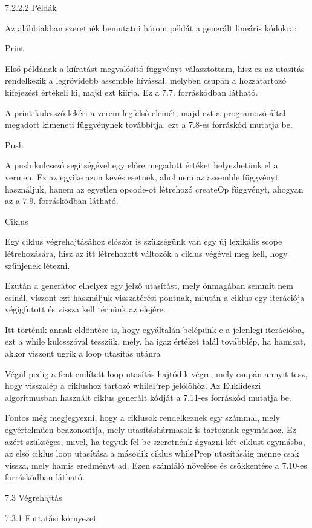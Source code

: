 7.2.2.2 Példák

Az alábbiakban szeretnék bemutatni három példát a generált lineáris kódokra:

Print

Első példának a kiíratást megvalósító függvényt választottam, hisz ez az utasítás rendelkezik a legrövidebb assemble hívással, melyben csupán a hozzátartozó kifejezést értékeli ki, majd ezt kiírja. Ez a 7.7. forráskódban látható.

A print kulcsszó lekéri a verem legfelső elemét, majd ezt a programozó által megadott kimeneti függvénynek továbbítja, ezt a 7.8-es forráskód mutatja be. 

Push

A push kulcsszó segítségével egy előre megadott értéket helyezhetünk el a vermen. Ez az egyike azon kevés esetnek, ahol nem az assemble függvényt használjuk, hanem az egyetlen opcode-ot létrehozó createOp függvényt, ahogyan az a 7.9. forráskódban látható.

Ciklus

Egy ciklus végrehajtásához először is szükségünk van egy új lexikális scope létrehozására, hisz az itt létrehozott változók a ciklus végével meg kell, hogy szűnjenek létezni.

Ezután a generátor elhelyez egy jelző utasítást, mely önmagában semmit nem csinál, viszont ezt használjuk visszatérési pontnak, miután a ciklus egy iterációja végigfutott és vissza kell térnünk az elejére.

Itt történik annak eldöntése is, hogy egyáltalán belépünk-e a jelenlegi iterációba, ezt a while kulcsszóval tesszük, mely, ha igaz értéket talál továbblép, ha hamisat, akkor viszont ugrik a loop utasítás utánra 

Végül pedig a fent említett loop utasítás hajtódik végre, mely csupán annyit tesz, hogy visszalép a ciklushoz tartozó whilePrep jelölőhöz. Az Euklideszi algoritmusban használt ciklus generált kódját a 7.11-es forráskód mutatja be.

Fontos még megjegyezni, hogy a ciklusok rendelkeznek egy számmal, mely egyértelműen beazonosítja, mely utasításhármasok is tartoznak egymáshoz. Ez azért szükséges, mivel, ha tegyük fel be szeretnénk ágyazni két ciklust egymásba, az első ciklus loop utasítása a második ciklus whilePrep utasításáig menne csak vissza, mely hamis eredményt ad. Ezen számláló növelése és csökkentése a 7.10-es forráskódban látható.

7.3 Végrehajtás

7.3.1 Futtatási környezet

